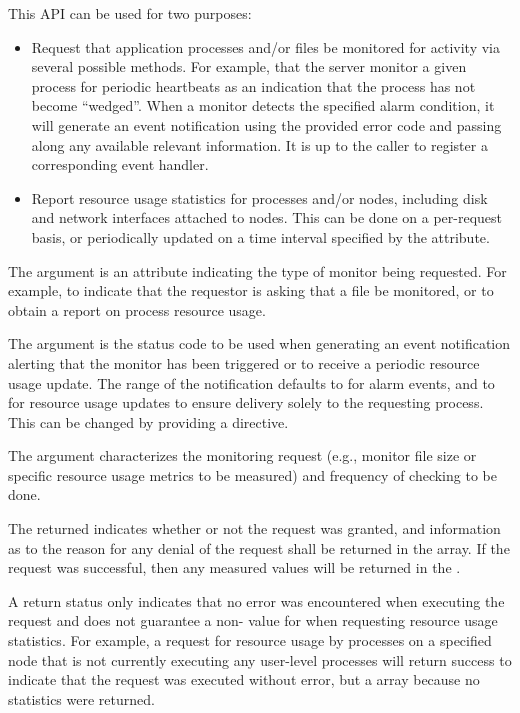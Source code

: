 \descr

This \ac{API} can be used for two purposes:

\begin{itemize}
    \item Request that application processes and/or files be monitored for activity via several possible methods. For example, that the server monitor a given process for periodic heartbeats as an indication that the process has not become ``wedged''. When a monitor detects the specified alarm condition, it will generate an event notification using the provided error code and passing along any available relevant information. It is up to the caller to register a corresponding event handler.
    \item Report resource usage statistics for processes and/or nodes, including disk and network interfaces attached to nodes. This can be done on a per-request basis, or periodically updated on a time interval specified by the  attribute.
\end{itemize}

The  argument is an attribute indicating the type of monitor being requested.
For example,  to indicate that the requestor is asking that a file be monitored, or  to obtain a report on process resource usage.

The  argument is the status code to be used when generating an event notification alerting that the monitor has been triggered or to receive a periodic resource usage update.
The range of the notification defaults to  for alarm events, and to  for resource usage updates to ensure delivery solely to the requesting process. This can be changed by providing a  directive.

The  argument characterizes the monitoring request (e.g., monitor file size or specific resource usage metrics to be measured) and frequency of checking to be done.

The returned  indicates whether or not the request was granted, and information as to the reason for any denial of the request shall be returned in the  array. If the request was successful, then any measured values will be returned in the .

\adviceuserstart
A  return status only indicates that no error was encountered when executing the request and does not guarantee a non- value for  when requesting resource usage statistics. For example, a request for resource usage by processes on a specified node that is not currently executing any user-level processes will return success to indicate that the request was executed without error, but a   array because no statistics were returned.
\adviceuserend

